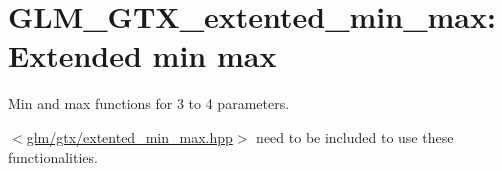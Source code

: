 \hypertarget{group__gtx__extented__min__max}{\section{\-G\-L\-M\-\_\-\-G\-T\-X\-\_\-extented\-\_\-min\-\_\-max\-: \-Extended min max}
\label{group__gtx__extented__min__max}
}
\-Min and max functions for 3 to 4 parameters.

$<$\hyperlink{extented__min__max_8hpp}{glm/gtx/extented\-\_\-min\-\_\-max.\-hpp}$>$ need to be included to use these functionalities. 
